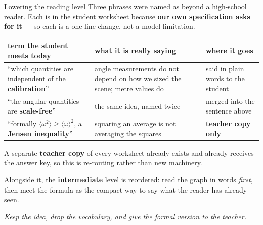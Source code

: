 \documentclass[aspectratio=169,10pt]{beamer}
\newcommand{\takeaway}[1]{\vfill{\footnotesize\itshape\color{cGrey}#1\par}}
\begin{document}
\begin{frame}{Lowering the reading level}
\scriptsize
Three phrases were named as beyond a high-school reader. Each is in the student worksheet because
\textbf{our own specification asks for it} --- so each is a one-line change, not a model limitation.
\vspace{4pt}

\renewcommand{\arraystretch}{1.45}
\begin{tabular}{@{}p{4.5cm}p{4.6cm}p{4.6cm}@{}}
\toprule
\textbf{term the student meets today} & \textbf{what it is really saying} & \textbf{where it goes} \\
\midrule
``which quantities are independent of the \textbf{calibration}'' &
angle measurements do not depend on how we sized the scene; metre values do &
said in plain words to the student \\
``the angular quantities are \textbf{scale-free}'' &
the same idea, named twice &
merged into the sentence above \\
``formally $\langle\omega^2\rangle \ge \langle\omega\rangle^2$, a \textbf{Jensen inequality}'' &
squaring an average is not averaging the squares &
\textbf{teacher copy only} \\
\bottomrule
\end{tabular}
\vspace{6pt}

\small A separate \textbf{teacher copy} of every worksheet already exists and already receives the
answer key, so this is re-routing rather than new machinery.
\vspace{2pt}

Alongside it, the \textbf{intermediate} level is reordered: read the graph in words \emph{first},
then meet the formula as the compact way to say what the reader has already seen.
\takeaway{Keep the idea, drop the vocabulary, and give the formal version to the teacher.}
\end{frame}
\end{document}
